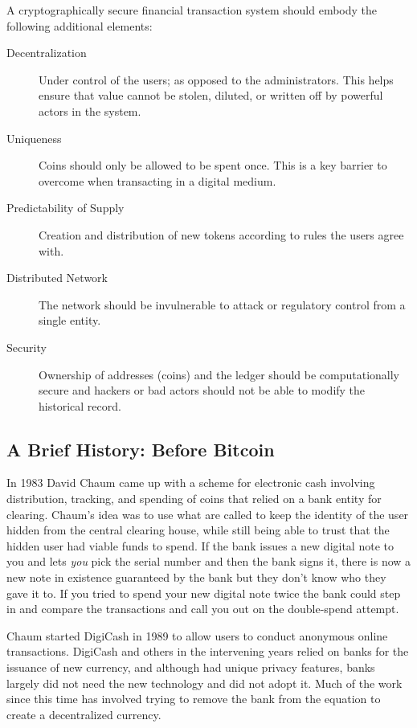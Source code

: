 A cryptographically secure financial transaction system should embody the following additional elements:
	\begin{description}	
	\item [Decentralization] Under control of the users; as opposed to the administrators. This helps ensure that value cannot be stolen, diluted, or written off by powerful actors in the system.
	\item [Uniqueness] Coins should only be allowed to be spent once. This is a key barrier to overcome when transacting in a digital medium.
	\item [Predictability of Supply] Creation and distribution of new tokens according to rules the users agree with. 
	\item [Distributed Network] The network should be invulnerable to attack or regulatory control from a single entity.
	\item [Security] Ownership of addresses (coins) and the ledger should be computationally secure and  hackers or bad actors should not be able to modify the historical record.
\end{description}
\subsection*{A Brief History: Before Bitcoin}
In 1983 David Chaum came up with a scheme for electronic cash involving distribution, tracking, and spending of coins that relied on a bank entity for clearing. Chaum's idea was to use what are called  to keep the identity of the user hidden from the central clearing house, while still being able to trust that the hidden user had viable funds to spend. If the bank issues a new digital note to you and lets \textit{you} pick the serial number and then the bank signs it, there is now a new note in existence guaranteed by the bank but they don't know who they gave it to. If you tried to spend your new digital note twice the bank could step in and compare the transactions and call you out on the double-spend attempt.

Chaum started DigiCash in 1989 to allow users to conduct anonymous online transactions. DigiCash and others in the intervening years relied on banks for the issuance of new currency, and although had unique privacy features, banks largely did not need the new technology and did not adopt it. Much of the work since this time has involved trying to remove the bank from the equation to create a decentralized currency.  

